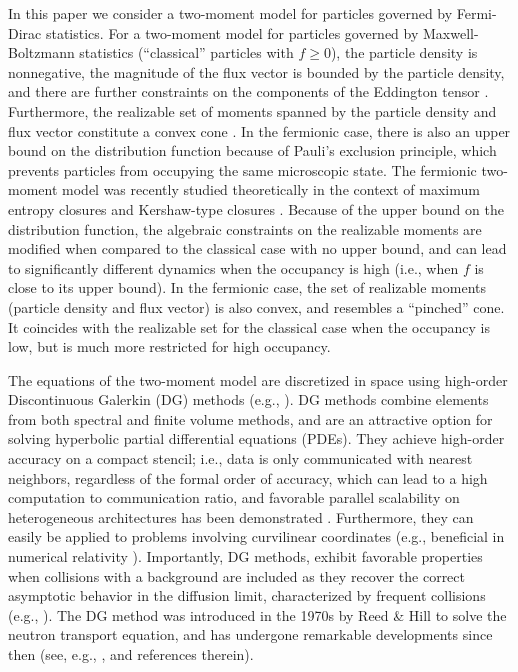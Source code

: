 In this paper we consider a two-moment model for particles governed by Fermi-Dirac statistics.  
For a two-moment model for particles governed by Maxwell-Boltzmann statistics (``classical'' particles with $f\ge0$), the particle density is nonnegative, the magnitude of the flux vector is bounded by the particle density, and there are further constraints on the components of the Eddington tensor \cite{levermore_1984}.  
Furthermore, the realizable set of moments spanned by the particle density and flux vector constitute a convex cone \cite{olbrant_etal_2012}.  
In the fermionic case, there is also an upper bound on the distribution function because of Pauli's exclusion principle, which prevents particles from occupying the same microscopic state.  
The fermionic two-moment model was recently studied theoretically in the context of maximum entropy closures \cite{lareckiBanach_2011,banachLarecki_2013,banachLarecki_2017b} and Kershaw-type closures \cite{banachLarecki_2017a}.  
Because of the upper bound on the distribution function, the algebraic constraints on the realizable moments are modified when compared to the classical case with no upper bound, and can lead to significantly different dynamics when the occupancy is high (i.e., when $f$ is close to its upper bound).  
In the fermionic case, the set of realizable moments (particle density and flux vector) is also convex, and resembles a ``pinched'' cone.  
It coincides with the realizable set for the classical case when the occupancy is low, but is much more restricted for high occupancy.  

The equations of the two-moment model are discretized in space using high-order Discontinuous Galerkin (DG) methods (e.g., \cite{cockburnShu_2001,hesthavenWarburton_2008}).  
DG methods combine elements from both spectral and finite volume methods, and are an attractive option for solving hyperbolic partial differential equations (PDEs).  
They achieve high-order accuracy on a compact stencil; i.e., data is only communicated with nearest neighbors, regardless of the formal order of accuracy, which can lead to a high computation to communication ratio, and favorable parallel scalability on heterogeneous architectures has been demonstrated \cite{klockner_etal_2009}.  
Furthermore, they can easily be applied to problems involving curvilinear coordinates (e.g., beneficial in numerical relativity \cite{teukolsky_2016}).  
Importantly, DG methods, exhibit favorable properties when collisions with a background are included as they recover the correct asymptotic behavior in the diffusion limit, characterized by frequent collisions (e.g., \cite{larsenMorel_1989,adams_2001,guermondKanschat_2010}).  
The DG method was introduced in the 1970s by Reed \& Hill \cite{reedHill_1973} to solve the neutron transport equation, and has undergone remarkable developments since then (see, e.g., \cite{shu_2016}, and references therein).  

